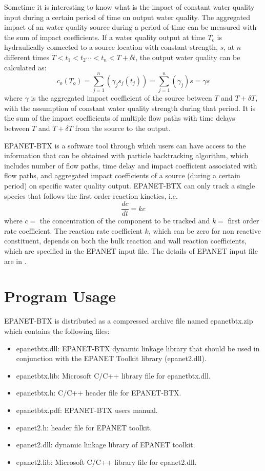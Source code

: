 \documentclass[12pt,letterpaper]{article}
\begin{document}
Sometime it is interesting to know what is the impact of constant
water quality input during a certain period of time on output water
quality. The aggregated impact of an water quality source during a
period of time can be measured with the sum of impact coefficients.
If a water quality output at time $T_o$ is hydraulically connected
to a source location with constant strength, $s$, at $n$ different
times $T<t_1<t_2\cdots<t_n<T+\delta t$, the output water quality can
be calculated as:
\begin{equation}\label{lineario2}
c_o(T_o)=\sum_{j=1}^n(\gamma_js_j(t_j))=\sum_{j=1}^n(\gamma_j)s=\gamma
s
\end{equation}
where $\gamma$ is the aggregated impact coefficient of the source
between $T$ and $T+\delta T$, with the assumption of constant water
quality strength during that period. It is the sum of the impact
coefficients of multiple flow paths with time delays between $T$ and
$T+\delta T$ from the source to the output.

EPANET-BTX is a software tool through which users can have access to
the information that can be obtained with particle backtracking
algorithm, which includes number of flow paths, time delay and
impact coefficient associated with flow paths, and aggregated impact
coefficients of a source (during a certain period) on specific water
quality output. EPANET-BTX can only track a single species that
follows the first order reaction kinetics, i.e.
\begin{equation}
\frac{dc}{dt}=kc
\end{equation}
where $c=$ the concentration of the component to be tracked and $k=$
first order rate coefficient. The reaction rate coefficient $k$,
which can be zero for non reactive constituent, depends on both the
bulk reaction and wall reaction coefficients, which are specified in
the EPANET input file. The details of EPANET input file are in
\cite{Rossman2000}.
\section*{Program Usage}
EPANET-BTX is distributed as a compressed archive file named
epanetbtx.zip which contains the following files:
\begin{itemize}
\item epanetbtx.dll:    EPANET-BTX dynamic linkage library that should be used in conjunction with the EPANET Toolkit library (epanet2.dll).
\item epanetbtx.lib:    Microsoft C/C++ library file for
epanetbtx.dll.
\item epanetbtx.h:  C/C++ header file for EPANET-BTX.
\item epanetbtx.pdf:    EPANET-BTX users manual.
\item epanet2.h:    header file for EPANET toolkit.
\item epanet2.dll: dynamic linkage library of EPANET toolkit.
\item epanet2.lib: Microsoft C/C++ library file for
epanet2.dll.
\end{itemize}
\end{document}
